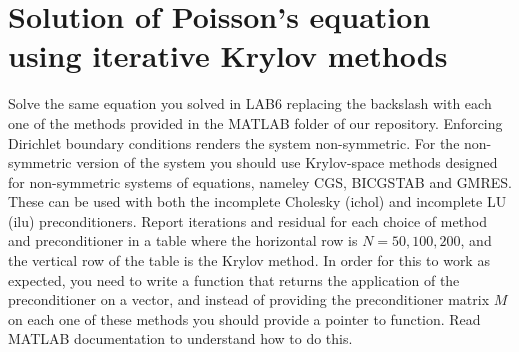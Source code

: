 \documentclass[unicode,11pt,a4paper,oneside,numbers=endperiod,openany]{scrartcl}
\begin{document}
\setassignment
{}

\section*{Solution of Poisson's equation using iterative Krylov methods}
Solve the same equation you solved in LAB6 replacing the backslash
with each one of the methods provided in the MATLAB folder of our repository. 
Enforcing Dirichlet boundary conditions renders the system non-symmetric.
For the non-symmetric version of the system you should use Krylov-space methods
designed for non-symmetric systems of equations, nameley CGS, BICGSTAB and GMRES.
These can be used with both the incomplete Cholesky (ichol) and incomplete LU
(ilu) preconditioners. Report iterations and residual for each choice of method
and preconditioner in a table where the horizontal row is $N=50,100,200$,
and the vertical row of the table is the Krylov method. In order for this to work
as expected, you need to write a function that returns the application of the preconditioner
on a vector, and instead of providing the preconditioner matrix $M$ on each one of these
methods you should provide a pointer to function. Read MATLAB documentation to understand
how to do this.
\end{document}
